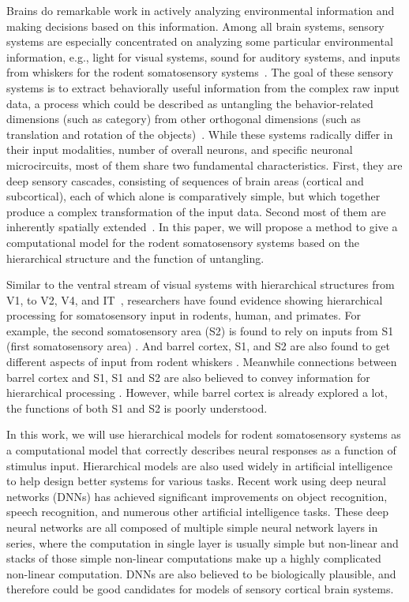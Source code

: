 Brains do remarkable work in actively analyzing environmental information and making decisions based on this information. Among all brain systems, sensory systems are especially concentrated on analyzing some particular environmental information, e.g., light for visual systems, sound for auditory systems, and inputs from whiskers for the rodent somatosensory systems~\cite{purves2001neuroscience}.
The goal of these sensory systems is to extract behaviorally useful information from the complex raw input data, a process which could be described as untangling the behavior-related dimensions (such as category) from other orthogonal dimensions (such as translation and rotation of the objects)~\cite{yamins2016using}.
While these systems radically differ in their input modalities, number of overall neurons, and specific neuronal microcircuits, most of them share two fundamental characteristics. First, they are deep sensory cascades, consisting of sequences of brain areas (cortical and subcortical), each of which alone is comparatively simple, but which together produce a complex transformation of the input data. Second most of them are inherently spatially extended~\cite{felleman1991distributed}.
In this paper, we will propose a method to give a computational model for the rodent somatosensory systems based on the hierarchical structure and the function of untangling.

Similar to the ventral stream of visual systems with hierarchical structures from V1, to V2, V4, and IT~\cite{felleman1991distributed, Goodale1992}, researchers have found evidence showing hierarchical processing for somatosensory input in rodents, human, and primates\cite{Pons1987, Inui2004, Iwamura1998}. For example, the second somatosensory area (S2) is found to rely on inputs from S1 (first somatosensory area) \cite{Pons1987, Petersen2007}. And barrel cortex, S1, and S2 are also found to get different aspects of input from rodent whiskers \cite{Diamond2008}. Meanwhile connections between barrel cortex and S1, S1 and S2 are also believed to convey information for hierarchical processing \cite{Petersen2007}. However, while barrel cortex is already explored a lot, the functions of both S1 and S2 is poorly understood.

In this work, we will use hierarchical models for rodent somatosensory systems as a computational model that correctly describes neural responses as a function of stimulus input. 
Hierarchical models are also used widely in artificial intelligence to help design better systems for various tasks. Recent work using deep neural networks (DNNs) has achieved significant improvements on object recognition, speech recognition, and numerous other artificial intelligence tasks\cite{Krizhevsky, hinton2012deep, lecun2015deep}. 
These deep neural networks are all composed of multiple simple neural network layers in series, where the computation in single layer is usually simple but non-linear and stacks of those simple non-linear computations make up a highly complicated non-linear computation. 
DNNs are also believed to be biologically plausible, and therefore could be good candidates for models of sensory cortical brain systems.

